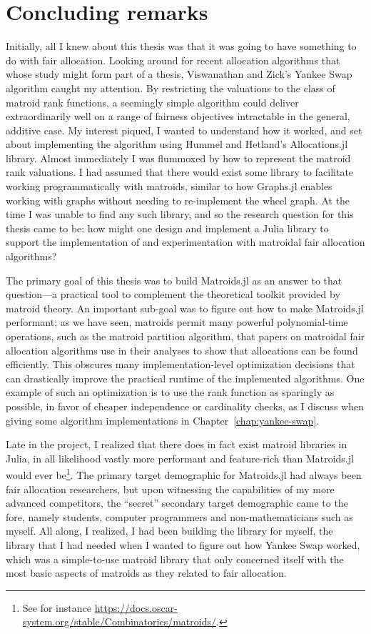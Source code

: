 \chapter{Concluding remarks}
\label{chap:conclusions}
Initially, all I knew about this thesis was that it was going to have something to do with fair allocation. Looking around for recent allocation algorithms that whose study might form part of a thesis, Viswanathan and Zick's Yankee Swap algorithm caught my attention. By restricting the valuations to the class of matroid rank functions, a seemingly simple algorithm could deliver extraordinarily well on a range of fairness objectives intractable in the general, additive case. My interest piqued, I wanted to understand how it worked, and set about implementing the algorithm using Hummel and Hetland's Allocations.jl library. Almost immediately I was flummoxed by how to represent the matroid rank valuations. I had assumed that there would exist some library to facilitate working programmatically with matroids, similar to how Graphs.jl enables working with graphs without needing to re-implement the wheel graph. At the time I was unable to find any such library, and so the research question for this thesis came to be: how might one design and implement a Julia library to support the implementation of and experimentation with matroidal fair allocation algorithms? 

The primary goal of this thesis was to build Matroids.jl as an answer to that question---a practical tool to complement the theoretical toolkit provided by matroid theory. An important sub-goal was to figure out how to make Matroids.jl performant; as we have seen, matroids permit many powerful polynomial-time operations, such as the matroid partition algorithm, that papers on matroidal fair allocation algorithms use in their analyses to show that allocations can be found efficiently. This obscures many implementation-level optimization decisions that can drastically improve the practical runtime of the implemented algorithms. One example of such an optimization is to use the rank function as sparingly as possible, in favor of cheaper independence or cardinality checks, as I discuss when giving some algorithm implementations in Chapter~\ref{chap:yankee-swap}.

Late in the project, I realized that there does in fact exist matroid libraries in Julia, in all likelihood vastly more performant and feature-rich than Matroids.jl would ever be\footnote{See for instance \href{https://docs.oscar-system.org/stable/Combinatorics/matroids/}{https://docs.oscar-system.org/stable/Combinatorics/matroids/}.}. The primary target demographic for Matroids.jl had always been fair allocation researchers, but upon witnessing the capabilities of my more advanced competitors, the ``secret'' secondary target demographic came to the fore, namely students, computer programmers and non-mathematicians such as myself. All along, I realized, I had been building the library for myself, the library that I had needed when I wanted to figure out how Yankee Swap worked, which was a simple-to-use matroid library that only concerned itself with the most basic aspects of matroids as they related to fair  allocation.

